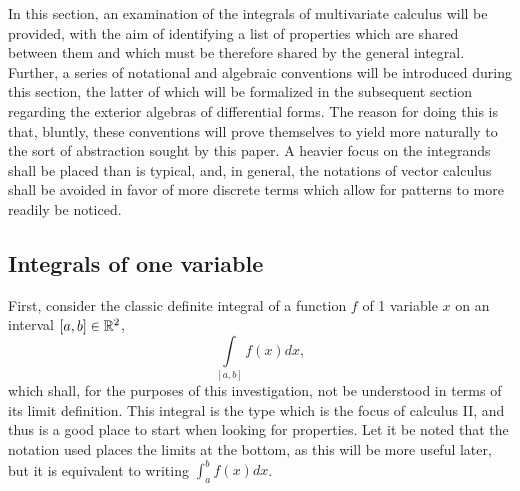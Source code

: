 \documentclass[.../main.tex]{subfiles}
\begin{document}
In this section, an examination of the integrals of multivariate calculus will be provided, with the aim of identifying a list of properties which are shared between them and which must be therefore shared by the general integral. Further, a series of notational and algebraic conventions will be introduced during this section, the latter of which will be formalized in the subsequent section regarding the exterior algebras of differential forms. The reason for doing this is that, bluntly, these conventions will prove themselves to yield more naturally to the sort of abstraction sought by this paper. A heavier focus on the integrands shall be placed than is typical, and, in general, the notations of vector calculus shall be avoided in favor of more discrete terms which allow for patterns to more readily be noticed.

\subsection{Integrals of one variable} \label{subsection: 2.1}
First, consider the classic definite integral of a function $f$ of 1 variable $x$ on an interval $[a, b] \in \mathbb{R}^{2}$,
\[
	\int\limits_{[a, b]} f(x) dx,
\]
which shall, for the purposes of this investigation, not be understood in terms of its limit definition\footnotemark. This integral is the type which is the focus of calculus II, and thus is a good place to start when looking for properties. Let it be noted that the notation used places the limits at the bottom, as this will be more useful later, but it is equivalent to writing $\int^b_a f(x)dx$.
\end{document}

